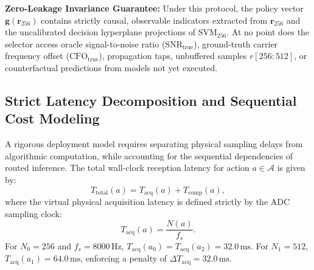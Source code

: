 \begin{table}[t]
\caption{Operational Characteristics of the Tripartite Action Set $\mathcal{A}$ (Full-Route Synced Profiling, 3 Sessions $\times$ 300 Calls)}
\label{tab:action_characteristics}
\centering
\renewcommand{\arraystretch}{1.2}
\setlength{\tabcolsep}{4.5pt}
\end{table}

\textbf{Zero-Leakage Invariance Guarantee:} Under this protocol, the policy vector $\mathbf{g}(\mathbf{r}_{256})$ contains strictly causal, observable indicators extracted from $\mathbf{r}_{256}$ and the uncalibrated decision hyperplane projections of $\mathrm{SVM}_{256}$. At no point does the selector access oracle signal-to-noise ratio ($\mathrm{SNR}_{\mathrm{true}}$), ground-truth carrier frequency offset ($\mathrm{CFO}_{\mathrm{true}}$), propagation taps, unbuffered samples $r[256:512]$, or counterfactual predictions from models not yet executed.

\subsection{Strict Latency Decomposition and Sequential Cost Modeling}
\label{subsec:latency_decomposition}

A rigorous deployment model requires separating physical sampling delays from algorithmic computation, while accounting for the sequential dependencies of routed inference. The total wall-clock reception latency for action $a \in \mathcal{A}$ is given by:
\begin{equation}
    T_{\mathrm{total}}(a) = T_{\mathrm{acq}}(a) + T_{\mathrm{comp}}(a),
    \label{eq:t_total_general}
\end{equation}
where the virtual physical acquisition latency is defined strictly by the ADC sampling clock:
\begin{equation}
    T_{\mathrm{acq}}(a) = \frac{N(a)}{f_s}.
    \label{eq:t_acq}
\end{equation}
For $N_0 = 256$ and $f_s = 8000\,\mathrm{Hz}$, $T_{\mathrm{acq}}(a_0) = T_{\mathrm{acq}}(a_2) = 32.0\,\mathrm{ms}$. For $N_1 = 512$, $T_{\mathrm{acq}}(a_1) = 64.0\,\mathrm{ms}$, enforcing a penalty of $\Delta T_{\mathrm{acq}} = 32.0\,\mathrm{ms}$.

